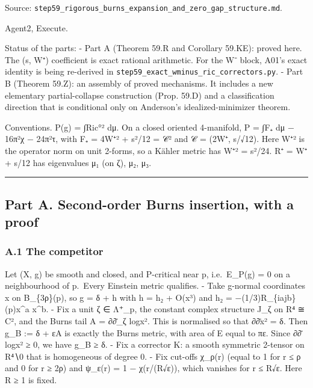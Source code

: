 \documentclass[
  10pt,
]{report}
\begin{document}
Source:
\texttt{step59\_rigorous\_burns\_expansion\_and\_zero\_gap\_structure.md}.

Agent2, Execute.

Status of the parts: - Part A (Theorem 59.R and Corollary 59.KE): proved
here. The (s, W⁺) coefficient is exact rational arithmetic. For the W⁻
block, A01's exact identity is being re-derived in
\texttt{step59\_exact\_wminus\_ric\_correctors.py}. - Part B (Theorem
59.Z): an assembly of proved mechanisms. It includes a new elementary
partial-collapse construction (Prop. 59.D) and a classification
direction that is conditional only on Anderson's idealized-minimizer
theorem.

Conventions. P(g) = ∫\textbar Ric°\textbar² dμ. On a closed oriented
4-manifold, P = ∫F₊ dμ − 16π²χ − 24π²τ, with F₊ = 4\textbar W⁺\textbar²
+ s²/12 = \textbar 𝒞\textbar² and 𝒞 = (2W⁺, s/√12). Here
\textbar W⁺\textbar² is the operator norm on unit 2-forms, so a Kähler
metric has \textbar W⁺\textbar² = s²/24. R⁺ = W⁺ + s/12 has eigenvalues
μ₁ (on ζ), μ₂, μ₃.

\begin{center}\rule{0.5\linewidth}{0.5pt}\end{center}

\hypertarget{part-a.-second-order-burns-insertion-with-a-proof}{%
\subsection{Part A. Second-order Burns insertion, with a
proof}\label{part-a.-second-order-burns-insertion-with-a-proof}}

\hypertarget{a.1-the-competitor}{%
\subsubsection{A.1 The competitor}\label{a.1-the-competitor}}

Let (X, g) be smooth and closed, and P-critical near p, i.e.~E\_P(g) = 0
on a neighbourhood of p.~Every Einstein metric qualifies. - Take
g-normal coordinates x on B\_\{3ρ\}(p), so g = δ + h with h = h₂ +
O(\textbar x\textbar³) and h₂ = −(1/3)R\_\{iajb\}(p)x\^{}a x\^{}b. - Fix
a unit ζ ∈ Λ⁺\_p, the constant complex structure J\_ζ on R⁴ ≅ C², and
the Burns tail A = ∂∂̄\_ζ log\textbar x\textbar². This is normalised so
that ∂∂̄\textbar x\textbar² = δ. Then g\_B := δ + εA is exactly the Burns
metric, with area of E equal to πε. Since ∂∂̄ log\textbar x\textbar² ≥ 0,
we have g\_B ≥ δ. - Fix a corrector K: a smooth symmetric 2-tensor on
R⁴∖0 that is homogeneous of degree 0. - Fix cut-offs χ\_ρ(r) (equal to 1
for r ≤ ρ and 0 for r ≥ 2ρ) and ψ\_ε(r) = 1 − χ(r/(R√ε)), which vanishes
for r ≤ R√ε. Here R ≥ 1 is fixed.
\end{document}
